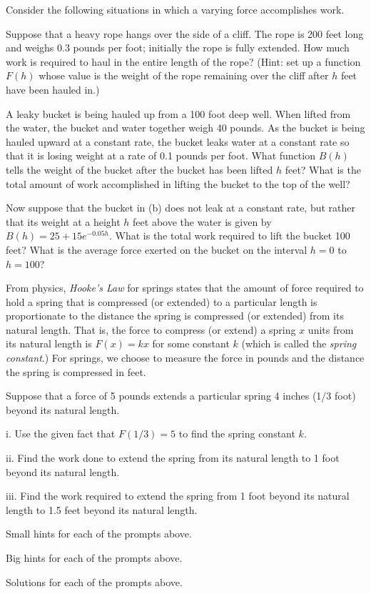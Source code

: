 \begin{activity} \label{A:6.4.1}  Consider the following situations in which a varying force accomplishes work.
\ba
	\item Suppose that a heavy rope hangs over the side of a cliff.  The rope is 200 feet long and weighs 0.3 pounds per foot; initially the rope is fully extended.  How much work is required to haul in the entire length of the rope?  (Hint: set up a function $F(h)$ whose value is the weight of the rope remaining over the cliff after $h$ feet have been hauled in.)
	\item A leaky bucket is being hauled up from a 100 foot deep well.  When lifted from the water, the bucket and water together weigh 40 pounds.  As the bucket is being hauled upward at a constant rate, the bucket leaks water at a constant rate so that it is losing weight at a rate of 0.1 pounds per foot.  What function $B(h)$ tells the weight of the bucket after the bucket has been lifted $h$ feet?  What is the total amount of work accomplished in lifting the bucket to the top of the well?
	\item Now suppose that the bucket in (b) does not leak at a constant rate, but rather that its weight at a height $h$ feet above the water is given by $B(h) = 25 + 15e^{-0.05h}$.  What is the total work required to lift the bucket 100 feet?  What is the average force exerted on the bucket on the interval $h = 0$ to $h = 100$?
	\item From physics, \emph{Hooke's Law}  for springs states that the amount of force required to hold a spring that is compressed (or extended) to a particular length is proportionate to the distance the spring is compressed (or extended) from its natural length.  That is, the force to compress (or extend) a spring $x$ units from its natural length is $F(x) = kx$ for some constant $k$ (which is called the \emph{spring constant}.) For springs, we choose to measure the force in pounds and the distance the spring is compressed in feet.
	
	Suppose that a force of 5 pounds extends a particular spring 4 inches (1/3 foot) beyond its natural length.
	\be
		\item[i.]  Use the given fact that $F(1/3) = 5$ to find the spring constant $k$.
		\item[ii.]  Find the work done to extend the spring from its natural length to 1 foot beyond its natural length.
		\item[iii.]  Find the work required to extend the spring from 1 foot beyond its natural length to 1.5 feet beyond its natural length.
	\ee

\ea

\end{activity}
\begin{smallhint}
\ba
	\item Small hints for each of the prompts above.
\ea
\end{smallhint}
\begin{bighint}
\ba
	\item Big hints for each of the prompts above.
\ea
\end{bighint}
\begin{activitySolution}
\ba
	\item Solutions for each of the prompts above.
\ea
\end{activitySolution}
\aftera